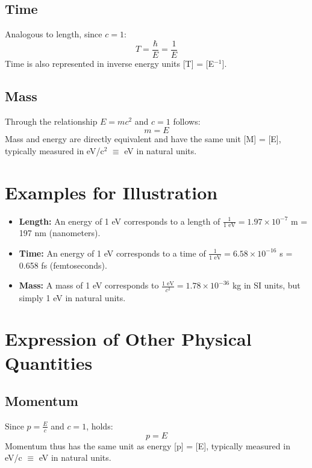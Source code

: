 \documentclass[12pt,a4paper]{article}
\begin{document}
	\subsection{Time}
	Analogous to length, since $c=1$:
	\begin{equation}
		T = \frac{\hbar}{E} = \frac{1}{E}
	\end{equation}
	Time is also represented in inverse energy units [T] = [E$^{-1}$].
	
	\subsection{Mass}
	Through the relationship $E = mc^2$ and $c=1$ follows:
	\begin{equation}
		m = E
	\end{equation}
	Mass and energy are directly equivalent and have the same unit [M] = [E], typically measured in eV/c$^2$ $\equiv$ eV in natural units.
	
	\section{Examples for Illustration}
	
	\begin{itemize}
		\item \textbf{Length:} An energy of 1 eV corresponds to a length of $\frac{1}{1\text{ eV}} = 1.97 \times 10^{-7}$ m = 197 nm (nanometers).
		\item \textbf{Time:} An energy of 1 eV corresponds to a time of $\frac{1}{1\text{ eV}} = 6.58 \times 10^{-16}$ s = 0.658 fs (femtoseconds).
		\item \textbf{Mass:} A mass of 1 eV corresponds to $\frac{1\text{ eV}}{c^2} = 1.78 \times 10^{-36}$ kg in SI units, but simply 1 eV in natural units.
	\end{itemize}
	
	\section{Expression of Other Physical Quantities}
	
	\subsection{Momentum}
	Since $p = \frac{E}{c}$ and $c=1$, holds:
	\begin{equation}
		p = E
	\end{equation}
	Momentum thus has the same unit as energy [p] = [E], typically measured in eV/c $\equiv$ eV in natural units.
	
\end{document}
